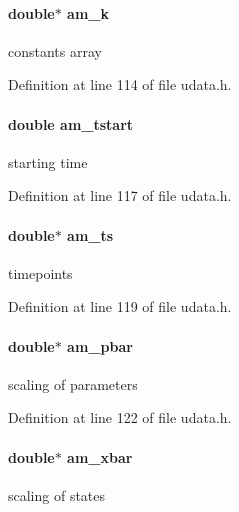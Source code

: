 \paragraph[{am\+\_\+k}]{\setlength{\rightskip}{0pt plus 5cm}double$\ast$ am\+\_\+k}\label{struct_user_data_a7b59855746129befdcfe9f3c8a4d2a4c}
constants array 

Definition at line 114 of file udata.\+h.

\hypertarget{struct_user_data_a230439d483e6fde07a6fe687219060c2}{}
\paragraph[{am\+\_\+tstart}]{\setlength{\rightskip}{0pt plus 5cm}double am\+\_\+tstart}\label{struct_user_data_a230439d483e6fde07a6fe687219060c2}
starting time 

Definition at line 117 of file udata.\+h.

\hypertarget{struct_user_data_a368434a79bdb1655bef3adc552834ddc}{}
\paragraph[{am\+\_\+ts}]{\setlength{\rightskip}{0pt plus 5cm}double$\ast$ am\+\_\+ts}\label{struct_user_data_a368434a79bdb1655bef3adc552834ddc}
timepoints 

Definition at line 119 of file udata.\+h.

\hypertarget{struct_user_data_aa73d75cc02e28bcdf108cbea53e615e9}{}
\paragraph[{am\+\_\+pbar}]{\setlength{\rightskip}{0pt plus 5cm}double$\ast$ am\+\_\+pbar}\label{struct_user_data_aa73d75cc02e28bcdf108cbea53e615e9}
scaling of parameters 

Definition at line 122 of file udata.\+h.

\hypertarget{struct_user_data_ad21f2b82715b051daf2775ed059afdbb}{}
\paragraph[{am\+\_\+xbar}]{\setlength{\rightskip}{0pt plus 5cm}double$\ast$ am\+\_\+xbar}\label{struct_user_data_ad21f2b82715b051daf2775ed059afdbb}
scaling of states 

